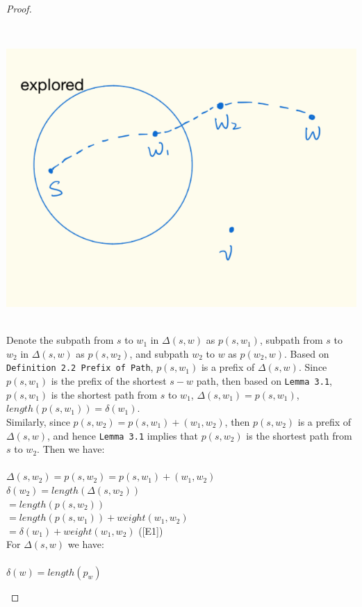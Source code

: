 \begin{proof}
\begin{itemize}
  \\
  \begin{center}
  \includegraphics[scale = 0.35]{p1.png}
  \end{center}
  \tab\\
  Denote the subpath from $s$ to $w_1$ in $\Delta(s, w)$ as $p(s, w_1)$, subpath from $s$ to $w_2$ in $\Delta(s, w)$ as $p(s, w_2)$, and subpath $w_2$ to $w$ as $p(w_2, w)$. Based on \texttt{Definition 2.2 Prefix of Path}, $p(s, w_1)$ is a prefix of $\Delta(s, w)$. Since $p(s, w_1)$ is the prefix of the shortest $s-w$ path, then based on \texttt{Lemma 3.1}, $p(s, w_1)$ is the shortest path from $s$ to $w_1$, $\Delta(s, w_1) = p(s, w_1)$, $length(p(s, w_1)) = \delta(w_1)$. 
  \\
  Similarly, since $p(s, w_2) = p(s, w_1) + (w_1, w_2)$, then $p(s, w_2)$ is a prefix of $\Delta(s, w)$, and hence \texttt{Lemma 3.1} implies that $p(s, w_2)$ is the shortest path from $s$ to $w_2$. Then we have: 
  \\\\
  \ftab $\Delta(s, w_2) = p(s, w_2) = p(s, w_1) + (w_1, w_2)$ \\
  \ftab $\delta(w_2) = length(\Delta(s, w_2))$ \\
  \ftab\tab $= length(p(s, w_2))$ \\
  \ftab\tab $= length(p(s, w_1)) + weight(w_1, w_2)$\\
  \ftab\tab $= \delta(w_1) + weight(w_1, w_2)$ ([E1])
  \\
  For $\Delta(s, w)$ we have: 
  \\\\
    \tab\tsp $\delta(w) = length(p_w)$ \\

\end{itemize}
\end{proof}
